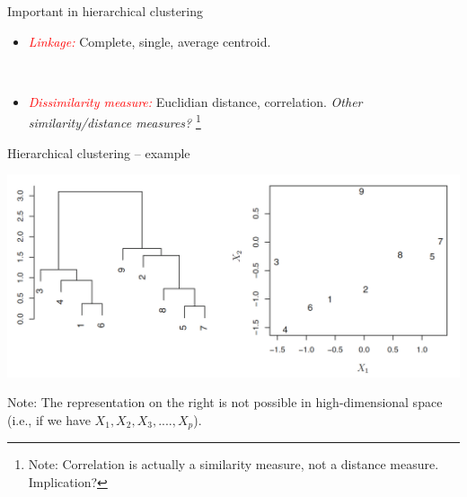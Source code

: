 \documentclass[
  10pt,
  ignorenonframetext,
]{beamer}
\providecommand{\tightlist}{%
  \setlength{\itemsep}{0pt}\setlength{\parskip}{0pt}}
\begin{document}
\begin{frame}
\begin{block}{Important in hierarchical clustering}
\protect\hypertarget{important-in-hierarchical-clustering}{}
\(~\)

\begin{itemize}
\tightlist
\item
  \emph{\textcolor{red}{Linkage:}} Complete, single, average centroid.
\end{itemize}

\(~\)

\begin{itemize}
\tightlist
\item
  \emph{\textcolor{red}{Dissimilarity measure:}} Euclidian distance,
  correlation. \emph{Other similarity/distance measures?}
  \footnote{ Note: Correlation is actually a similarity measure, not a distance measure. Implication?}
\end{itemize}
\end{block}
\end{frame}

\begin{frame}
\begin{block}{Hierarchical clustering -- example}
\protect\hypertarget{hierarchical-clustering-example}{}
\(~\)

\includegraphics{imgs/dendogram_misleading.png}

Note: The representation on the right is not possible in
high-dimensional space (i.e., if we have \(X_1, X_2, X_3, ...., X_p\)).
\end{block}
\end{frame}
\end{document}
